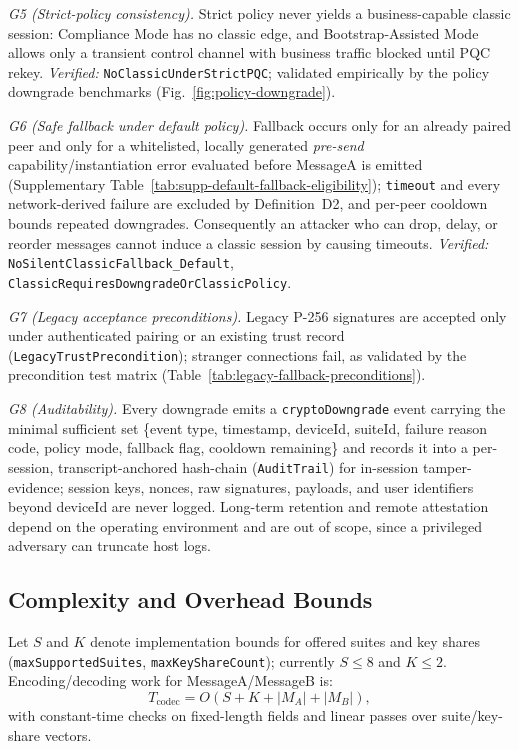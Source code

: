 \documentclass[10pt,journal,compsoc]{IEEEtran}
\begin{document}
\emph{G5 (Strict-policy consistency).} Strict policy never yields a
business-capable classic session: Compliance Mode has no classic edge,
and Bootstrap-Assisted Mode allows only a transient control channel with
business traffic blocked until PQC rekey. \emph{Verified:}
\texttt{NoClassicUnderStrictPQC}; validated empirically by the policy
downgrade benchmarks (Fig.~\ref{fig:policy-downgrade}).

\emph{G6 (Safe fallback under default policy).} Fallback occurs only for
an already paired peer and only for a whitelisted, locally generated
\emph{pre-send} capability/instantiation error evaluated before MessageA
is emitted (Supplementary
Table~\ref{tab:supp-default-fallback-eligibility}); \texttt{timeout} and
every network-derived failure are excluded by Definition~D2, and per-peer
cooldown bounds repeated downgrades. Consequently an attacker who can
drop, delay, or reorder messages cannot induce a classic session by
causing timeouts. \emph{Verified:}
\texttt{NoSilentClassicFallback\_Default},
\texttt{ClassicRequiresDowngradeOrClassicPolicy}.

\emph{G7 (Legacy acceptance preconditions).} Legacy P-256 signatures are
accepted only under authenticated pairing or an existing trust record
(\texttt{LegacyTrustPrecondition}); stranger connections fail, as
validated by the precondition test matrix
(Table~\ref{tab:legacy-fallback-preconditions}).

\emph{G8 (Auditability).} Every downgrade emits a \texttt{cryptoDowngrade}
event carrying the minimal sufficient set \{event type, timestamp,
deviceId, suiteId, failure reason code, policy mode, fallback flag,
cooldown remaining\} and records it into a per-session, transcript-anchored
hash-chain (\texttt{AuditTrail}) for in-session tamper-evidence; session
keys, nonces, raw signatures, payloads, and user identifiers beyond
deviceId are never logged. Long-term retention and remote attestation
depend on the operating environment and are out of scope, since a
privileged adversary can truncate host logs.

\subsection{Complexity and Overhead Bounds}\label{sec:complexity-bounds}

Let $S$ and $K$ denote implementation bounds for offered suites and key
shares (\texttt{maxSupportedSuites}, \texttt{maxKeyShareCount});
currently $S \le 8$ and $K \le 2$. Encoding/decoding work for
MessageA/MessageB is:
\[
T_{\mathrm{codec}} = O(S + K + |M_A| + |M_B|),
\]
with constant-time checks on fixed-length fields and linear passes over
suite/key-share vectors.
\end{document}

